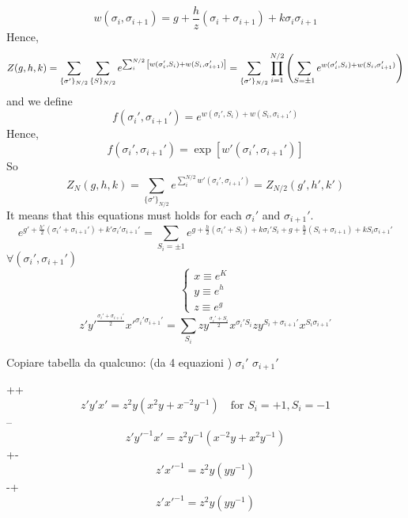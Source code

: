 \documentclass[../main/main.tex]{subfiles}
\begin{document}
\begin{equation}
  w (\sigma _i, \sigma _{i+1}) =  g + \frac{h}{z} (\sigma _i + \sigma _{i+1}) + k \sigma _i \sigma _{i+1}
\end{equation}
Hence,
\begin{equation}
  Z (g, h, k)  = \sum_{\{ \sigma' \}_{N/2}  }^{}  \sum_{\{ S \}_{N/2}  }^{} e^{\sum_{i}^{N/2} \qty[ w (\sigma _i', S_i) + w (S_i, \sigma _{i+1}' )  ] }
  = \sum_{\{ \sigma' \}_{N/2}  }^{}  \prod_{i=1}^{N/2} \qty( \sum_{S = \pm 1}^{}
  e^{ w (\sigma _i', S_i) + w (S_i, \sigma _{i+1}' )   }  )
\end{equation}
and we define
\begin{equation}
  f ( \sigma _i', \sigma _{i+1}') =   e^{ w (\sigma _i', S_i) + w (S_i, \sigma _{i+1}' )   }
\end{equation}
Hence,
\begin{equation}
  f ( \sigma _i', \sigma _{i+1}')  = \exp [ w' (\sigma _i', \sigma _{i+1}')]
\end{equation}
So
\begin{equation}
  Z_N (g,h,k) = \sum_{\{ \sigma' \}_{N/2}  }^{}  e^{\sum_{i}^{N/2}  w' (\sigma _i', \sigma _{i+1}' )  }
  = Z_{N/2} (g',h',k')
\end{equation}
It means that this equations must holds for each \( \sigma _i' \) and \( \sigma _{i+1}' \).
\begin{equation}
  e^{g'+\frac{h'}{2} (\sigma _i'+ \sigma _{i+1}') + k' \sigma _i' \sigma _{i+1}'}
  = \sum_{S_i = \pm 1}^{}
    e^{g +\frac{h}{2} (\sigma _i'+ S_i) + k \sigma _i' S_i + g + \frac{h}{2} (S_i + \sigma _{i+1}) + k S_i \sigma _{i+1}'}
\end{equation}
\( \forall (\sigma _i', \sigma _{i+1}') \)
\begin{equation}
  \begin{cases}
   x \equiv e^K\\
   y \equiv e^h\\
   z \equiv e^g
  \end{cases}
\end{equation}
\begin{equation}
  z' y'^{\frac{\sigma _i' + \sigma _{i+1}'}{2}  } x'^{\sigma _i' \sigma _{i+1}'}
  = \sum_{S_i}^{} z y^{ \frac{\sigma _i'+S_i}{2}} x^{\sigma _i' S_i} z y^{S_i + \sigma _{i+1}'} x^{S_i \sigma _{i+1}'}
\end{equation}

Copiare tabella da qualcuno: (da 4 equazioni )
\( \sigma _i' \) \( \sigma _{i+1}' \)

++
\begin{equation}
  z' y' x' = z^2 y (x^2 y + x^{-2} y^{-1}) \quad \text{for } S_i = +1, S_i =-1
\end{equation}
--
\begin{equation}
  z' y'^{-1} x' = z^2 y^{-1} (x^{-2} y + x^{2} y^{-1})
\end{equation}
+-
\begin{equation}
    z'  x'^{-1} = z^2 y (y y^{-1})
\end{equation}
-+
\begin{equation}
    z'  x'^{-1} = z^2 y (y y^{-1})
\end{equation}
\end{document}
